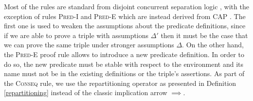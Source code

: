 Most of the rules are standard from disjoint concurrent separation logic \cite{csl}, with the exception of rules \textsc{Pred-I} and \textsc{Pred-E} which are instead derived from CAP \cite{cap}. The first one is used to weaken the assumptions about the predicate definitions, since if we are able to prove a triple with assumptions $\Delta'$ then it must be the case that we can prove the same triple under stronger assumptions $\Delta$. On the other hand, the \textsc{Pred-E} proof rule allows to introduce a new predicate definition. In order to do so, the new predicate must be stable with respect to the environment and its name must not be in the existing definitions or the triple's assertions. As part of the \textsc{Conseq} rule, we use the repartitioning operator as presented in Definition \ref{repartitioning} instead of the classic implication arrow $\implies$.